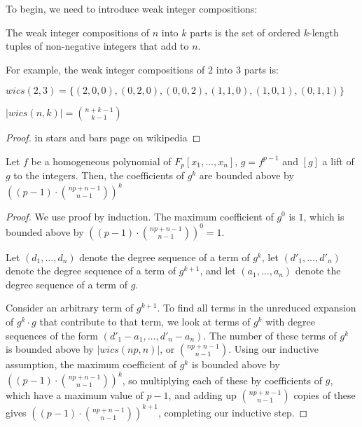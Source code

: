 To begin, we need to introduce weak integer compositions:

\begin{defn}
    The weak integer compositions of $n$ into $k$ parts is the set of ordered $k$-length tuples of non-negative integers that add to $n$.
\end{defn}

For example, the weak integer compositions of $2$ into $3$ parts is:
\begin{center}
    $wics(2, 3) = \lbrace (2, 0, 0), (0, 2, 0), (0, 0, 2), (1, 1, 0), (1, 0, 1), (0, 1, 1) \rbrace$
\end{center}

\begin{lem}
    $|wics(n, k)| = \binom{n + k - 1}{k - 1}$
\end{lem}

\begin{proof}
    in stars and bars page on wikipedia
\end{proof}

\begin{thm}
    Let $f$ be a homogeneous polynomial of $F_p[x_1, ..., x_n]$, $g = f ^ {p - 1}$ and $[g]$ a lift of $g$ to the integers. Then, the coefficients of $g ^ k$ are bounded above by $((p - 1) \cdot \binom{np + n - 1}{n - 1}) ^ k$
\end{thm}

\begin{proof}
    We use proof by induction. The maximum coefficient of $g^0$ is $1$, which is bounded above by $((p - 1) \cdot \binom{np + n - 1}{n - 1}) ^ 0 = 1$.
    
    Let $(d_1, \dots , d_n)$ denote the degree sequence of a term of $g^k$, let $(d'_1, \dots , d'_n)$ denote the degree sequence of a term of $g^{k + 1}$, and let $(a_1, \dots , a_n)$ denote the degree sequence of a term of $g$.

	Consider an arbitrary term of $g^{k + 1}$. To find all terms in the unreduced expansion of $g^k \cdot g$ that contribute to that term, we look at terms of $g^k$ with degree sequences of the form $(d'_1 - a_1, \dots , d'_n - a_n)$. The number of these terms of $g^k$ is bounded above by $|wics(np, n)|$, or $\binom{np + n - 1}{n - 1}$. Using our inductive assumption, the maximum coefficient of $g^k$ is bounded above by $((p - 1) \cdot \binom{np + n - 1}{n - 1}) ^ k$, so multiplying each of these by coefficients of $g$, which have a maximum value of $p - 1$, and adding up $\binom{np + n - 1}{n - 1}$ copies of these gives $((p - 1) \cdot \binom{np + n - 1}{n - 1}) ^ {k + 1}$, completing our inductive step.
\end{proof}


